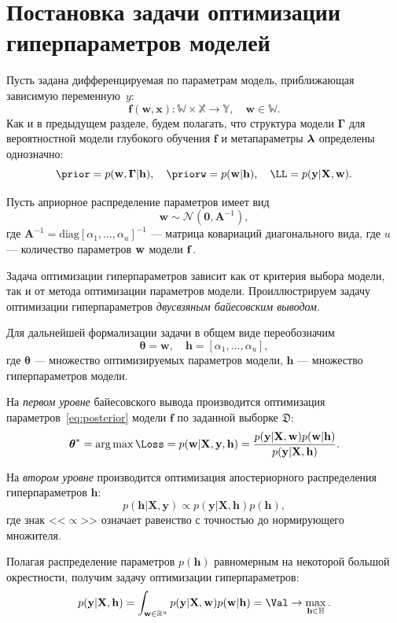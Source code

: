 \section{Постановка задачи оптимизации гиперпараметров моделей}
Пусть задана дифференцируемая по параметрам модель, приближающая зависимую переменную~$y$:
\[
	\mathbf{f}(\mathbf{w}, \mathbf{x}):\mathbb{W} \times \mathbb{X} \to \mathbb{Y}, \quad \mathbf{w} \in \mathbb{W}.
\]
Как и в предыдущем разделе, будем полагать, что структура модели $\boldsymbol{\Gamma}$ для вероятностной модели глубокого обучения $\mathbf{f}$ и метапараметры $\boldsymbol{\lambda}$ определены однозначно:
\[
    \prior = p(\w,\G|\h), \quad \priorw = p(\w|\h),\quad    \LL = p(\y|\X,\w).
\]

Пусть априорное распределение параметров имеет вид
\begin{equation}
\label{eq:prior}
	\mathbf{w} \sim \mathcal{N}(\mathbf{0}, \mathbf{A}^{-1}),
\end{equation}
где $\mathbf{A}^{-1} = \text{diag}[\alpha_1, \dots, \alpha_u]^{-1}$ --- матрица ковариаций диагонального вида, где $u$ --- количество параметров $\mathbf{w}$ модели $\mathbf{f}$. 


Задача оптимизации гиперпараметров зависит как от критерия выбора модели, так и от метода оптимизации параметров модели.
Проиллюстрируем задачу оптимизации гиперпараметров \textit{двусвзяным байесовским выводом}.

\begin{example}
Для дальнейшей формализации задачи в общем виде переобозначим
\begin{equation}
\label{eq:bayes0}
	\boldsymbol{\theta} = \mathbf{w}, \quad \mathbf{h} = [\alpha_1, \dots, \alpha_u],	
\end{equation}
где $\boldsymbol{\theta}$ --- множество оптимизируемых параметров модели, $\mathbf{h}$ --- множество гиперпараметров модели.

На \textit{первом уровне} байесовского вывода производится оптимизация параметров~\eqref{eq:posterior} модели $\mathbf{f}$ по заданной выборке $\mathfrak{D}$:
\begin{equation}
\label{eq:bayes1}
{\boldsymbol{\theta}}^{*} = \argmax \Loss = p(\mathbf{w}|\mathbf{X}, \mathbf{y}, \mathbf{h}) = \frac{p(\mathbf{y}|\mathbf{X},\mathbf{w})p(\mathbf{w}|\mathbf{h})}{p(\mathbf{y}|\mathbf{X},\mathbf{h})}.
\end{equation}

На \textit{втором уровне} производится оптимизация апостериорного распределения гиперпараметров $\mathbf{h}$:
\[
p(\mathbf{h}|\mathbf{X}, \mathbf{y}) \propto p(\mathbf{y}|\mathbf{X},\mathbf{h})p(\mathbf{h}),
\]
где знак <<$\propto$>> означает равенство с точностью до нормирующего множителя.

Полагая распределение параметров $p(\mathbf{h})$ равномерным на некоторой большой окрестности, получим задачу оптимизации гиперпараметров:
\begin{equation}
\label{eq:bayes2}
	p(\mathbf{y}|\mathbf{X},\mathbf{h}) = \int_{\mathbf{w} \in \mathbb{R}^u} p(\mathbf{y}|\mathbf{X}, \mathbf{w}) p(\mathbf{w}|\mathbf{h}) = \Val \to \max_{\h \in \Hb}.
\end{equation}
\end{example}

